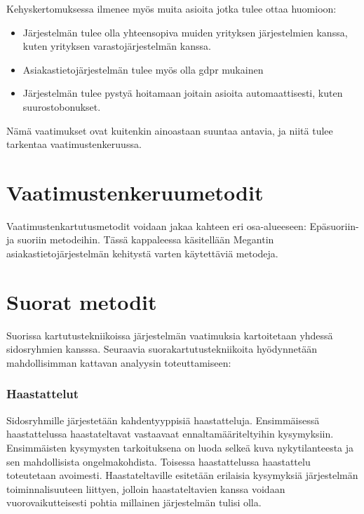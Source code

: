     Kehyskertomuksessa ilmenee myös muita asioita jotka tulee ottaa huomioon:
    
    \begin{itemize}
        \item Järjestelmän tulee olla yhteensopiva muiden yrityksen järjestelmien kanssa, kuten yrityksen varastojärjestelmän kanssa.
	\item Asiakastietojärjestelmän tulee myös olla \gls{gdpr} mukainen
        \item Järjestelmän tulee pystyä hoitamaan joitain asioita automaattisesti, kuten suurostobonukset.
    \end{itemize}

    Nämä vaatimukset ovat kuitenkin ainoastaan suuntaa antavia, ja niitä tulee tarkentaa vaatimustenkeruussa. 


\section{Vaatimustenkeruumetodit}

    Vaatimustenkartutusmetodit voidaan jakaa kahteen eri osa-alueeseen: Epäsuoriin- ja suoriin metodeihin.
    Tässä kappaleessa käsitellään Megantin asiakastietojärjestelmän kehitystä varten käytettäviä metodeja.


    \section*{Suorat metodit}

        Suorissa kartutustekniikoissa järjestelmän vaatimuksia kartoitetaan yhdessä sidosryhmien kansssa.
        Seuraavia suorakartutustekniikoita hyödynnetään mahdollisimman kattavan analyysin toteuttamiseen:

        \subsubsection*{Haastattelut}

            Sidosryhmille järjestetään kahdentyyppisiä haastatteluja. Ensimmäisessä haastattelussa haastateltavat vastaavaat ennaltamääriteltyihin kysymyksiin. 
            Ensimmäisten kysymysten tarkoituksena on luoda selkeä kuva nykytilanteesta ja sen mahdollisista ongelmakohdista. Toisessa haastattelussa haastattelu toteutetaan avoimesti. Haastateltaville esitetään erilaisia kysymyksiä järjestelmän toiminnalisuuteen liittyen, jolloin haastateltavien kanssa voidaan vuorovaikutteisesti pohtia millainen järjestelmän tulisi olla.

